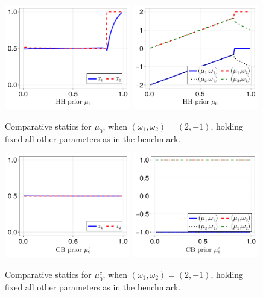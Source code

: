 \documentclass[12pt,a4paper]{article}
\begin{document}
\begin{figure}[H]
\centering
\includegraphics[width=0.49\textwidth]{figures/V8/γ_1/fig_optimal_π_across_μ_0_ω_1_2_ω_2_-1_δ_0.5_.pdf}
\includegraphics[width=0.49\textwidth]{figures/V8/γ_1/fig_posterior_across_μ_0_ω_1_2_ω_2_-1_δ_0.5_.pdf}
\caption{Comparative statics for $\mu_0$, when $(\omega_1,\omega_2)=(2,-1)$, holding fixed all other parameters as in the benchmark.}
\label{FigureA19}
\end{figure}

\begin{figure}[H]
\centering
\includegraphics[width=0.49\textwidth]{figures/V8/γ_1/fig_optimal_π_across_μ_0_c_ω_1_2_ω_2_-1_δ_0.5_.pdf}
\includegraphics[width=0.49\textwidth]{figures/V8/γ_1/fig_posterior_across_μ_0_c_ω_1_2_ω_2_-1_δ_0.5_.pdf}
\caption{Comparative statics for $\mu_0^c$, when $(\omega_1,\omega_2)=(2,-1)$, holding fixed all other parameters as in the benchmark.}
\label{FigureA20}
\end{figure}
\end{document}
